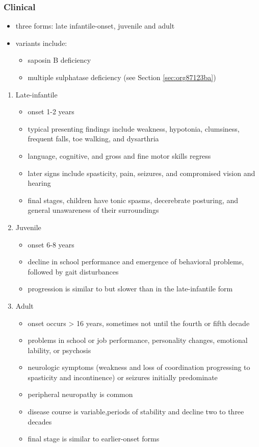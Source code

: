 \documentclass[12pt]{scrartcl}
\begin{document}
\subsubsection{Clinical}
\label{sec:orgd58a06c}
\begin{itemize}
\item three forms: late infantile-onset, juvenile and adult
\item variants include:
\begin{itemize}
\item saposin B deficiency
\item multiple sulphatase deficiency (see Section \ref{sec:org87123ba})
\end{itemize}
\end{itemize}
\begin{enumerate}
\item Late-infantile
\label{sec:org19915a4}
\begin{itemize}
\item onset 1-2 years
\item typical presenting findings include weakness, hypotonia, clumsiness, frequent falls, toe walking, and dysarthria
\item language, cognitive, and gross and fine motor skills regress
\item later signs include spasticity, pain, seizures, and compromised vision and hearing
\item final stages, children have tonic spasms, decerebrate posturing, and
general unawareness of their surroundings
\end{itemize}

\item Juvenile
\label{sec:orgb763b91}
\begin{itemize}
\item onset 6-8 years
\item decline in school performance and emergence of behavioral problems, followed by gait disturbances
\item progression is similar to but slower than in the late-infantile form
\end{itemize}

\item Adult
\label{sec:org6d5c4bd}
\begin{itemize}
\item onset occurs \textgreater{} 16 years, sometimes not until the fourth or fifth decade
\item problems in school or job performance, personality changes, emotional lability, or psychosis
\item neurologic symptoms (weakness and loss of coordination progressing
to spasticity and incontinence) or seizures initially
predominate
\item peripheral neuropathy is common
\item disease course is variable,periods of stability and decline two to three decades
\item final stage is similar to earlier-onset forms
\end{itemize}
\end{enumerate}
\end{document}
